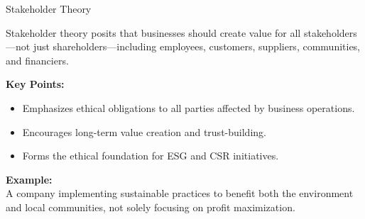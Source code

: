 \documentclass[aspectratio=169, 10pt]{beamer}
\begin{document}
\begin{frame}{Stakeholder Theory}

\begin{tcolorbox}[colback=WHUblue!5!white, colframe=WHUblue, title=Definition, fonttitle=\bfseries, sharp corners=south]
Stakeholder theory posits that businesses should create value for all stakeholders—not just shareholders—including employees, customers, suppliers, communities, and financiers.
\end{tcolorbox}

\vspace{1em}

\textbf{Key Points:}
\begin{itemize}
  \item Emphasizes ethical obligations to all parties affected by business operations.
  \item Encourages long-term value creation and trust-building.
  \item Forms the ethical foundation for ESG and CSR initiatives.
\end{itemize}

\vspace{1em}

\textbf{Example:} \\
A company implementing sustainable practices to benefit both the environment and local communities, not solely focusing on profit maximization.

\end{frame}
\end{document}

